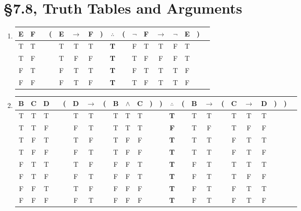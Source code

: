 % 
% 

\section{\S 7.8, Truth Tables and Arguments}
\begin{enumerate}

\item
\begin{tabular}{@{ }c@{ }@{ }c | c@{ }@{}c@{}@{ }c@{ }@{ }c@{ }@{ }c@{ }@{}c@{}@{ }c@{ }@{}c@{}@{ }c@{ }@{ }c@{ }@{ }c@{ }@{ }c@{ }@{ }c@{ }@{}c@{}@{ }c}
    E & F &  & ( & E & $\rightarrow$ & F & ) & $\therefore $ & ( & $\lnot$ & F & $\rightarrow$ & $\lnot$ & E & ) & \\
    \hline
    T & T &  &  & T & T & T &  & \textbf{T} &  & F & T & T & F & T &  & \\
    T & F &  &  & T & F & F &  & \textbf{T} &  & T & F & F & F & T &  & \\
    F & T &  &  & F & T & T &  & \textbf{T} &  & F & T & T & T & F &  & \\
    F & F &  &  & F & T & F &  & \textbf{T} &  & T & F & T & T & F &  & \\
\end{tabular}

\item
\begin{tabular}{@{ }c@{ }@{ }c@{ }@{ }c | c@{ }@{}c@{}@{ }c@{ }@{ }c@{ }@{}c@{}@{ }c@{ }@{ }c@{ }@{ }c@{ }@{}c@{}@{}c@{}@{ }c@{ }@{}c@{}@{ }c@{ }@{ }c@{ }@{}c@{}@{ }c@{ }@{ }c@{ }@{ }c@{ }@{}c@{}@{}c@{}@{ }c}
B & C & D &  & ( & D & $\rightarrow$ & ( & B & $\land$ & C & ) & ) & $\therefore $ & ( & B & $\rightarrow$ & ( & C & $\rightarrow$ & D & ) & ) & \\
\hline
T & T & T &  &  & T & T &  & T & T & T &  &  & \textbf{T} &  & T & T &  & T & T & T &  &  & \\
T & T & F &  &  & F & T &  & T & T & T &  &  & \textbf{F} &  & T & F &  & T & F & F &  &  & \\
T & F & T &  &  & T & F &  & T & F & F &  &  & \textbf{T} &  & T & T &  & F & T & T &  &  & \\
T & F & F &  &  & F & T &  & T & F & F &  &  & \textbf{T} &  & T & T &  & F & T & F &  &  & \\
F & T & T &  &  & T & F &  & F & F & T &  &  & \textbf{T} &  & F & T &  & T & T & T &  &  & \\
F & T & F &  &  & F & T &  & F & F & T &  &  & \textbf{T} &  & F & T &  & T & F & F &  &  & \\
F & F & T &  &  & T & F &  & F & F & F &  &  & \textbf{T} &  & F & T &  & F & T & T &  &  & \\
F & F & F &  &  & F & T &  & F & F & F &  &  & \textbf{T} &  & F & T &  & F & T & F &  &  & \\
\end{tabular}

\end{enumerate}
% 
